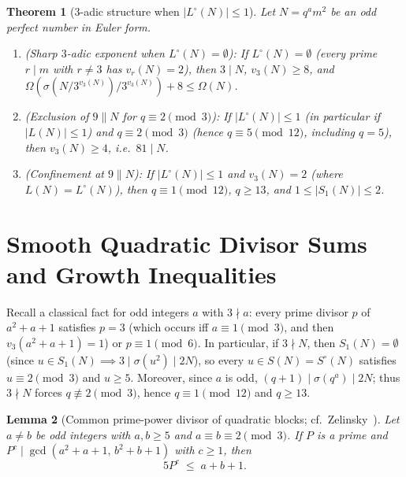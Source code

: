 \documentclass[11pt]{amsart}
\newtheorem{theorem}{Theorem}
\newtheorem{lemma}[theorem]{Lemma}
\theoremstyle{definition}
\theoremstyle{remark}
\begin{document}
\begin{theorem}[$3$-adic structure when $|L^\circ(N)| \le 1$]\label{thm:three-present}
Let $N = q^a m^2$ be an odd perfect number in Euler form.
\begin{enumerate}
  \item \emph{(Sharp $3$-adic exponent when $L^\circ(N) = \emptyset$):} If $L^\circ(N) = \emptyset$ (every prime $r \mid m$ with $r \ne 3$ has $v_r(N) = 2$), then $3 \mid N$, $v_3(N) \ge 8$, and $\Omega(\sigma(N/3^{v_3(N)})/3^{v_3(N)}) + 8 \le \Omega(N)$.
  \item \emph{(Exclusion of $9 \parallel N$ for $q \equiv 2 \pmod 3$):} If $|L^\circ(N)| \le 1$ (in particular if $|L(N)| \le 1$) and $q \equiv 2 \pmod 3$ (hence $q \equiv 5 \pmod{12}$, including $q = 5$), then $v_3(N) \ge 4$, i.e.\ $81 \mid N$.
  \item \emph{(Confinement at $9 \parallel N$):} If $|L^\circ(N)| \le 1$ and $v_3(N) = 2$ (where $L(N) = L^\circ(N)$), then $q \equiv 1 \pmod{12}$, $q \ge 13$, and $1 \le |S_1(N)| \le 2$.
\end{enumerate}
\end{theorem}

\section{Smooth Quadratic Divisor Sums and Growth Inequalities}

Recall a classical fact for odd integers $a$ with $3 \nmid a$: every prime divisor $p$ of $a^2 + a + 1$ satisfies $p = 3$ (which occurs iff $a \equiv 1 \pmod 3$, and then $v_3(a^2 + a + 1) = 1$) or $p \equiv 1 \pmod 6$. In particular, if $3 \nmid N$, then $S_1(N) = \emptyset$ (since $u \in S_1(N) \implies 3 \mid \sigma(u^2) \mid 2N$), so every $u \in S(N) = S^\circ(N)$ satisfies $u \equiv 2 \pmod 3$ and $u \ge 5$. Moreover, since $a$ is odd, $(q + 1) \mid \sigma(q^a) \mid 2N$; thus $3 \nmid N$ forces $q \not\equiv 2 \pmod 3$, hence $q \equiv 1 \pmod{12}$ and $q \ge 13$.

\begin{lemma}[Common prime-power divisor of quadratic blocks; cf.\ Zelinsky~\cite{Zelinsky2021}]\label{lem:common-pow}
Let $a \ne b$ be odd integers with $a, b \ge 5$ and $a \equiv b \equiv 2 \pmod 3$. If $P$ is a prime and $P^c \mid \gcd(a^2 + a + 1,\, b^2 + b + 1)$ with $c \ge 1$, then
\[
  5 P^c \;\le\; a + b + 1.
\]
\end{lemma}
\end{document}
